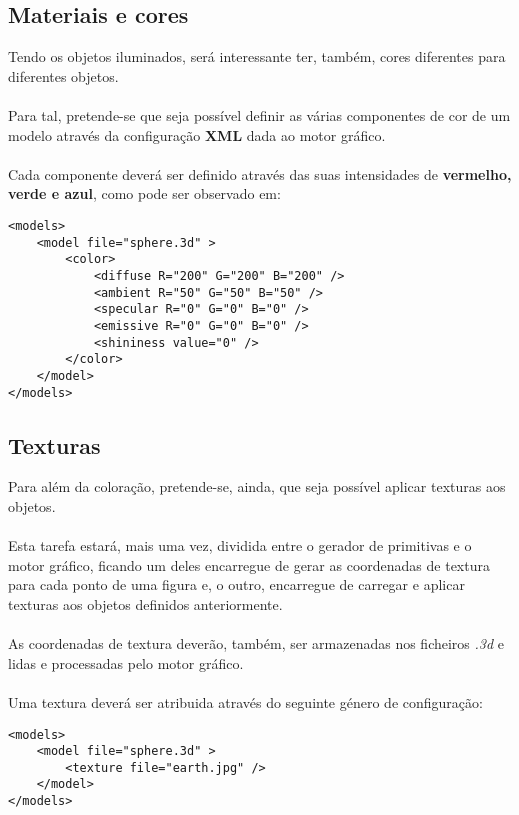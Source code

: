 \subsection{Materiais e cores}
Tendo os objetos iluminados, será interessante ter, também,
cores diferentes para diferentes objetos.\\
\\
Para tal, pretende-se que seja possível definir as várias
componentes de cor de um modelo através da configuração
\textbf{XML} dada ao motor gráfico.\\
\\
Cada componente deverá ser definido através das suas intensidades
de \textbf{vermelho, verde e azul}, como pode ser observado em:\\

\begin{tcolorbox}[
    colback=blue!10!white,
    colframe=black!50!black,
    after upper={\hfill\textbf{xml}}
]
\begin{verbatim}
<models>
    <model file="sphere.3d" >
        <color>
            <diffuse R="200" G="200" B="200" />
            <ambient R="50" G="50" B="50" />
            <specular R="0" G="0" B="0" />
            <emissive R="0" G="0" B="0" />
            <shininess value="0" />
        </color>
    </model>
</models>
\end{verbatim}
\end{tcolorbox}

\subsection{Texturas}
Para além da coloração, pretende-se, ainda, que seja possível
aplicar texturas aos objetos.\\
\\
Esta tarefa estará, mais uma vez, dividida entre o gerador de
primitivas e o motor gráfico, ficando um deles encarregue de
gerar as coordenadas de textura para cada ponto de uma figura e, o 
outro, encarregue de carregar e aplicar texturas aos objetos
definidos anteriormente.\\
\\
As coordenadas de textura deverão, também, ser armazenadas
nos ficheiros \textit{.3d} e lidas e processadas pelo motor
gráfico.\\
\\
Uma textura deverá ser atribuida através do seguinte género
de configuração:\\

\begin{tcolorbox}[
    colback=blue!10!white,
    colframe=black!50!black,
    after upper={\hfill\textbf{xml}}
]
\begin{verbatim}
<models>
    <model file="sphere.3d" >
        <texture file="earth.jpg" />
    </model>
</models>
\end{verbatim}
\end{tcolorbox}
